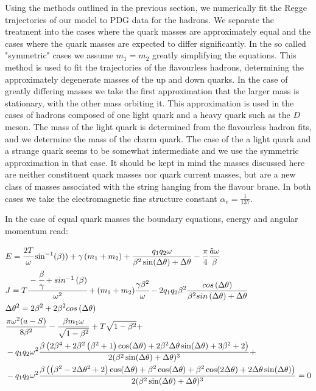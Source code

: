 \documentclass[11pt,a4paper]{article}
\begin{document}
Using the methods outlined in the previous section, we numerically fit the Regge trajectories of our model to PDG data for the hadrons. We separate the treatment into the cases where the quark masses are approximately equal and the cases where the quark masses are expected to differ significantly. In the so called "symmetric" cases we assume $m_{1}=m_{2}$ greatly simplifying the equations. This method is used to fit the trajectories of the flavourless hadrons, determining the approximately degenerate masses of the up and down quarks. In the case of greatly differing masses we take the first approximation that the larger mass is stationary, with the other mass orbiting it. This approximation is used in the cases of hadrons composed of one light quark and a heavy quark such as the $D$ meson. The mass of the light quark is determined from the flavourless hadron fits, and we determine the mass of the charm quark. The case of the a light quark and a strange quark seems to be somewhat intermediate and we use the symmetric approximation in that case. It should be kept in mind the masses discussed here are neither constituent quark masses nor quark current masses, but are a new class of masses associated with the string hanging from the flavour brane. In both cases we take the electromagnetic fine structure constant $\alpha_{e}=\frac{1}{137}$.

In the case of equal quark masses the boundary equations, energy and angular momentum read:

\begin{subequations}
\label{eq:regge}
\begin{align}
&E=\cfrac{2T}{\omega}\sin^{-1}(\beta))+\gamma\left(m_{1}+m_{2}\right)+\frac{q_{1}q_{2}\omega}{\beta^2\sin(\Delta\theta)+\Delta\theta}-\frac{\pi}{4}\frac{\tilde{a}\omega}{\beta}\\
&J=T\cfrac{-\cfrac{\beta}{\gamma}+sin^{-1}\left(\beta\right)}{\omega^{2}}+(m_{1}+m_{2})\cfrac{\gamma\beta^{2}}{\omega}-2q_{1}q_{2}\beta^2\frac{cos\left(\Delta\theta\right)}{\beta^2sin\left(\Delta\theta\right)+\Delta\theta}\\
&\Delta\theta^{2}=2\beta^{2}+2\beta^2cos\left(\Delta\theta\right)\\
&\frac{\pi \omega ^2 (a-S)}{8 \beta^2}-\frac{\beta m_1 \omega }{\sqrt{1-\beta^2}}+T\sqrt{1-\beta^2}+\\
&-q_1 q_2 \omega^2 \frac{\beta \left(2 \beta^4+2\beta^2 \left(\beta^2+1\right) \cos (\Delta \theta )+2 \beta^2 \Delta \theta  \sin (\Delta \theta )+3 \beta^2+2\right)}{2 (\beta^2 \sin (\Delta \theta )+\Delta \theta )^3}+\notag\\
&-q_1 q_2 \omega^2\frac{\beta \left(\left(\beta^2-2 \Delta \theta ^2+2\right) \cos (\Delta \theta )+\beta^2 \cos (\Delta \theta )+\beta^2 \cos (2 \Delta \theta )+2 \Delta \theta  \sin (\Delta \theta )\right)}{2 (\beta^2 \sin (\Delta \theta )+\Delta \theta )^3}=0\notag
\end{align}
\end{subequations}
\end{document}
